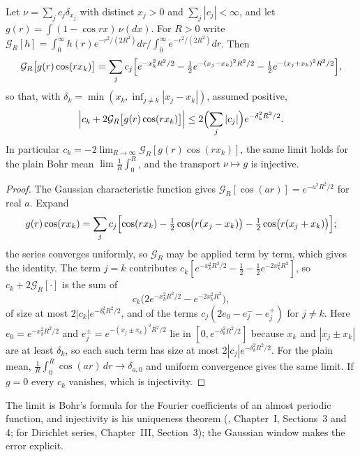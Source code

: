 \begin{theorem}\label{thm:lapbohr}
Let $\nu=\sum_jc_j\delta_{x_j}$ with distinct $x_j>0$ and $\sum_j|c_j|<\infty$, and let $g(r)=\int(1-\cos rx)\,\nu(dx)$. For $R>0$ write $\mathcal G_R[h]=\int_0^\infty h(r)e^{-r^2/(2R^2)}dr\big/\int_0^\infty e^{-r^2/(2R^2)}dr$. Then
\[
\mathcal G_R\bigl[g(r)\cos(rx_k)\bigr]=\sum_jc_j\Bigl[e^{-x_k^2R^2/2}-\tfrac12e^{-(x_j-x_k)^2R^2/2}-\tfrac12e^{-(x_j+x_k)^2R^2/2}\Bigr],
\]
so that, with $\delta_k=\min(x_k,\inf_{j\ne k}|x_j-x_k|)$, assumed positive,
\[
\Bigl|c_k+2\mathcal G_R\bigl[g(r)\cos(rx_k)\bigr]\Bigr|\le2\Bigl(\sum_j|c_j|\Bigr)e^{-\delta_k^2R^2/2}.
\]
In particular $c_k=-2\lim_{R\to\infty}\mathcal G_R[g(r)\cos(rx_k)]$, the same limit holds for the plain Bohr mean $\lim\frac1R\int_0^R$, and the transport $\nu\mapsto g$ is injective.
\end{theorem}

\begin{proof}
The Gaussian characteristic function gives $\mathcal G_R[\cos(ar)]=e^{-a^2R^2/2}$ for real $a$. Expand
\[
g(r)\cos(rx_k)=\sum_jc_j\Bigl[\cos(rx_k)-\tfrac12\cos\bigl(r(x_j-x_k)\bigr)-\tfrac12\cos\bigl(r(x_j+x_k)\bigr)\Bigr];
\]
the series converges uniformly, so $\mathcal G_R$ may be applied term by term, which gives the identity. The term $j=k$ contributes $c_k[e^{-x_k^2R^2/2}-\frac12-\frac12e^{-2x_k^2R^2}]$, so $c_k+2\mathcal G_R[\cdot]$ is the sum of
\[
c_k\bigl(2e^{-x_k^2R^2/2}-e^{-2x_k^2R^2}\bigr),
\]
of size at most $2|c_k|e^{-\delta_k^2R^2/2}$, and of the terms $c_j(2e_0-e_j^{-}-e_j^{+})$ for $j\ne k$. Here $e_0=e^{-x_k^2R^2/2}$ and $e_j^\pm=e^{-(x_j\pm x_k)^2R^2/2}$ lie in $[0,e^{-\delta_k^2R^2/2}]$ because $x_k$ and $|x_j\pm x_k|$ are at least $\delta_k$, so each such term has size at most $2|c_j|e^{-\delta_k^2R^2/2}$. For the plain mean, $\frac1R\int_0^R\cos(ar)\,dr\to\delta_{a,0}$ and uniform convergence gives the same limit. If $g=0$ every $c_k$ vanishes, which is injectivity.
\end{proof}

The limit is Bohr's formula for the Fourier coefficients of an almost periodic function, and injectivity is his uniqueness theorem (\cite{besicovitch1932}, Chapter~I, Sections~3 and 4; for Dirichlet series, Chapter~III, Section~3); the Gaussian window makes the error explicit.

